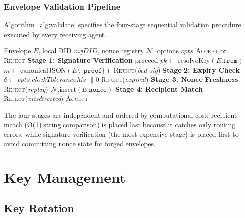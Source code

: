 \documentclass[conference]{IEEEtran}
\newcommand{\Verify}{\mathsf{Verify}}
\begin{document}
\subsubsection{Envelope Validation Pipeline}

Algorithm~\ref{alg:validate} specifies the four-stage sequential
validation procedure executed by every receiving agent.

\begin{algorithm}[t]
\caption{Envelope Validation Pipeline}
\label{alg:validate}
\begin{algorithmic}[1]
\Require Envelope $E$, local DID $\mathit{myDID}$,
         nonce registry $\mathcal{N}$,
         options $\mathit{opts}$
\Ensure \textsc{Accept} or \textsc{Reject}
\State \textbf{Stage 1: Signature Verification}
  \State proceed 
\Else
  \State $pk \leftarrow \mathrm{resolveKey}(E.\texttt{from})$
  \State $m \leftarrow \mathrm{canonicalJSON}(E \setminus
         \{\texttt{proof}\})$
  \If{$\lnot\,\Verify(pk,\, m,\, E.\texttt{proof.sig})$}
    \State \Return \textsc{Reject}(\textit{bad-sig})
  \EndIf
\EndIf
\State \textbf{Stage 2: Expiry Check}
\State $\delta \leftarrow \mathit{opts.clockToleranceMs}$
       $\!\parallel\! 0$
  \State \Return \textsc{Reject}(\textit{expired})
\EndIf
\State \textbf{Stage 3: Nonce Freshness}
  \State \Return \textsc{Reject}(\textit{replay})
\EndIf
\State $\mathcal{N}.\mathrm{insert}(E.\texttt{nonce})$
\State \textbf{Stage 4: Recipient Match}
  \State \Return \textsc{Reject}(\textit{misdirected})
\EndIf
\State \Return \textsc{Accept}
\end{algorithmic}
\end{algorithm}

The four stages are independent and ordered by computational
cost: recipient-match (O(1) string comparison) is placed last
because it catches only routing errors, while signature
verification (the most expensive stage) is placed first to
avoid committing nonce state for forged envelopes.

\section{Key Management}
\label{sec:keymanagement}

\subsection{Key Rotation}
\end{document}
